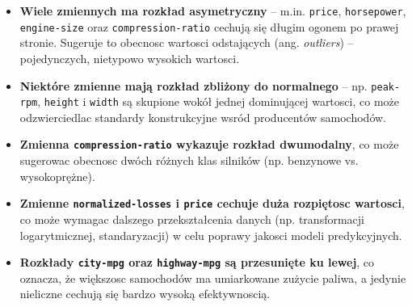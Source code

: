 \documentclass[12pt,a4paper]{article}
\begin{document}
\begin{itemize}
    \item \textbf{Wiele zmiennych ma rozkład asymetryczny} – m.in. \texttt{price}, \texttt{horsepower}, \texttt{engine-size} oraz \texttt{compression-ratio} cechują się długim ogonem po prawej stronie. Sugeruje to obecnosc wartosci odstających (ang. \textit{outliers}) – pojedynczych, nietypowo wysokich wartosci.

    \item \textbf{Niektóre zmienne mają rozkład zbliżony do normalnego} – np. \texttt{peak-rpm}, \texttt{height} i \texttt{width} są skupione wokół jednej dominującej wartosci, co może odzwierciedlac standardy konstrukcyjne wsród producentów samochodów.

    \item \textbf{Zmienna \texttt{compression-ratio} wykazuje rozkład dwumodalny}, co może sugerowac obecnosc dwóch różnych klas silników (np. benzynowe vs. wysokoprężne).

    \item \textbf{Zmienne \texttt{normalized-losses} i \texttt{price} cechuje duża rozpiętosc wartosci}, co może wymagac dalszego przekształcenia danych (np. transformacji logarytmicznej, standaryzacji) w celu poprawy jakosci modeli predykcyjnych.

    \item \textbf{Rozkłady \texttt{city-mpg} oraz \texttt{highway-mpg} są przesunięte ku lewej}, co oznacza, że większosc samochodów ma umiarkowane zużycie paliwa, a jedynie nieliczne cechują się bardzo wysoką efektywnoscią.
\end{itemize}
\end{document}
